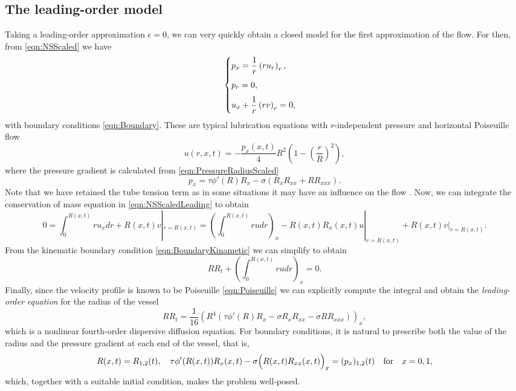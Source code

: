 \documentclass[12pt,a4paper]{article}
\begin{document}
\subsection{The leading-order model}
Taking a leading-order approximation $\epsilon = 0$, we can very quickly obtain a closed model for the first approximation of the flow. For then, from \eqref{eqn:NSScaled} we have
\begin{equation}\label{eqn:NSScaledLeading}
	\begin{cases}
		p_x = \dfrac{1}{r}\left(r u_r\right)_r, \vspace{6pt}\\
		p_r = 0, \vspace{6pt}\\
		u_x + \dfrac{1}{r} \left(r v\right)_r = 0, \\
	\end{cases}
\end{equation}
with boundary conditions \eqref{eqn:Boundary}. These are typical lubrication equations with $r$-independent pressure and horizontal Poiseuille flow
\begin{equation}\label{eqn:Poiseuille}
	u(r,x,t) = -\frac{p_x(x,t)}{4} R^2 \left(1-\left(\frac{r}{R}\right)^2\right),
\end{equation}
where the pressure gradient is calculated from \eqref{eqn:PressureRadiusScaled} 
\begin{equation}
	p_x = \tau \phi'(R) R_x - \sigma (R_x R_{xx} + RR_{xxx}).
\end{equation}
Note that we have retained the tube tension term as in some situations it may have an influence on the flow \cite{macdonald2008modeling}. Now, we can integrate the conservation of mass equation in \eqref{eqn:NSScaledLeading} to obtain
\begin{equation}
	0 = \int_0^{R(x,t)} r u_x dr + R(x,t) v|_{r=R(x,t)} = \left(\int_0^{R(x,t)} r u dr\right)_x - R(x,t) R_x(x,t)u|_{r=R(x,t)}  + R(x,t) v|_{r=R(x,t)}.
\end{equation}
From the kinematic boundary condition \eqref{eqn:BoundaryKinametic} we can simplify to obtain
\begin{equation}
	R R_t + \left(\int_0^{R(x,t)} r u dr\right)_x = 0.
\end{equation}
Finally, since the velocity profile is known to be Poiseuille \eqref{eqn:Poiseuille} we can explicitly compute the integral and obtain the \textit{leading-order equation} for the radius of the vessel
\begin{equation}\label{eqn:leadingOrderRadius}
	R R_t = \frac{1}{16} \left(R^4 \left(\tau \phi'(R) R_x-\sigma R_x R_{xx} - \sigma RR_{xxx}\right)\right)_x,
\end{equation}
which is a nonlinear fourth-order dispersive diffusion equation. For boundary conditions, it is natural to prescribe both the value of the radius and the pressure gradient at each end of the vessel, that is,
\begin{equation}
    R(x,t) = R_{1,2}(t), \quad \tau \phi'(R(x,t)) R_x(x,t) - \sigma \Bigl(R(x,t) R_{xx}(x,t)\Bigr)_x  = (p_x)_{1,2}(t) \quad \text{for} \quad x = 0,1,
\end{equation}
which, together with a suitable initial condition, makes the problem well-posed. 
\end{document}
